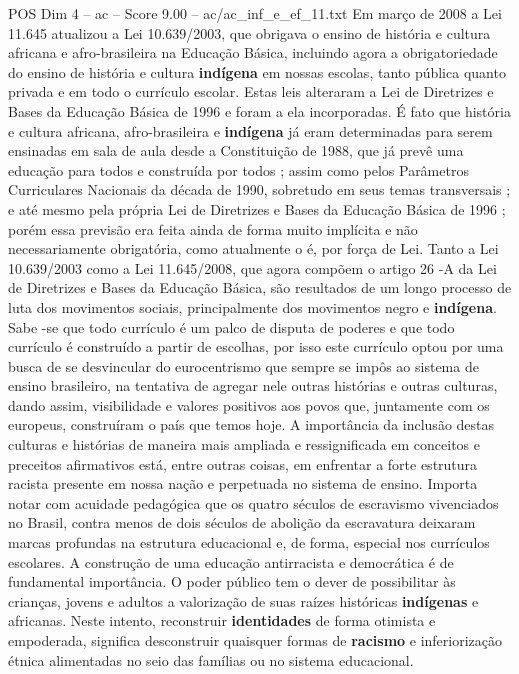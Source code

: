 \begin{textsample}{POS Dim 4 – ac – Score 9.00 – ac/ac\_inf\_e\_ef\_11.txt}
Em março de 2008 a Lei 11.645 atualizou a Lei 10.639/2003, que obrigava o ensino de história e cultura africana e afro-brasileira na Educação Básica, incluindo agora a obrigatoriedade do ensino de história e cultura \textbf{indígena} em nossas escolas, tanto pública quanto privada e em todo o currículo escolar.
Estas leis alteraram a Lei de Diretrizes e Bases da Educação Básica de 1996 e foram a ela incorporadas.
É fato que história e cultura africana, afro-brasileira e \textbf{indígena} já eram determinadas para serem ensinadas em sala de aula desde a Constituição de 1988, que já prevê uma educação para todos e construída por todos ; assim como pelos Parâmetros Curriculares Nacionais da década de 1990, sobretudo em seus temas transversais ; e até mesmo pela própria Lei de Diretrizes e Bases da Educação Básica de 1996 ; porém essa previsão era feita ainda de forma muito implícita e não necessariamente obrigatória, como atualmente o é, por força de Lei.
Tanto a Lei 10.639/2003 como a Lei 11.645/2008, que agora compõem o artigo 26 -A da Lei de Diretrizes e Bases da Educação Básica, são resultados de um longo processo de luta dos movimentos sociais, principalmente dos movimentos negro e \textbf{indígena}.
Sabe -se que todo currículo é um palco de disputa de poderes e que todo currículo é construído a partir de escolhas, por isso este currículo optou por uma busca de se desvincular do eurocentrismo que sempre se impôs ao sistema de ensino brasileiro, na tentativa de agregar nele outras histórias e outras culturas, dando assim, visibilidade e valores positivos aos povos que, juntamente com os europeus, construíram o país que temos hoje.
A importância da inclusão destas culturas e histórias de maneira mais ampliada e ressignificada em conceitos e preceitos afirmativos está, entre outras coisas, em enfrentar a forte estrutura racista presente em nossa nação e perpetuada no sistema de ensino.
Importa notar com acuidade pedagógica que os quatro séculos de escravismo vivenciados no Brasil, contra menos de dois séculos de abolição da escravatura deixaram marcas profundas na estrutura educacional e, de forma, especial nos currículos escolares.
A construção de uma educação antirracista e democrática é de fundamental importância.
O poder público tem o dever de possibilitar às crianças, jovens e adultos a valorização de suas raízes históricas \textbf{indígenas} e africanas.
Neste intento, reconstruir \textbf{identidades} de forma otimista e empoderada, significa desconstruir quaisquer formas de \textbf{racismo} e inferiorização étnica alimentadas no seio das famílias ou no sistema educacional.

\end{textsample}
